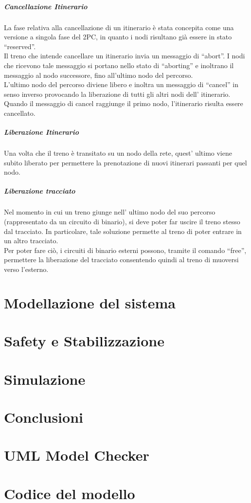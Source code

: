 \documentclass[10pt,a4paper,oneside]{report}
\begin{document}
\paragraph*{Cancellazione Itinerario}
La fase relativa alla cancellazione di un itinerario è stata concepita come una versione a singola fase del 2PC, in quanto i nodi risultano già essere in stato ``reserved''.\\
Il treno che intende cancellare un itinerario invia un messaggio di ``abort''. I nodi che ricevono tale messaggio si portano nello stato di ``aborting'' e inoltrano il messaggio al nodo successore, fino all'ultimo nodo del percorso.\\
L'ultimo nodo del percorso diviene libero e inoltra un messaggio di ``cancel'' in senso inverso provocando la liberazione di tutti gli altri nodi dell' itinerario. Quando il messaggio di cancel raggiunge il primo nodo, l'itinerario risulta essere cancellato.

\paragraph*{Liberazione Itinerario}
Una volta che il treno è transitato su un nodo della rete, quest' ultimo viene subito liberato per permettere la prenotazione di nuovi itinerari passanti per quel nodo.\\
\paragraph*{Liberazione tracciato}
Nel momento in cui un treno giunge nell' ultimo nodo del suo percorso (rappresentato da un circuito di binario), si deve poter far uscire il treno stesso dal tracciato.
In particolare, tale soluzione permette al treno di poter entrare in un altro tracciato.\\
Per poter fare ciò, i circuiti di binario esterni possono, tramite il comando ``free'', permettere la liberazione del tracciato consentendo quindi al treno di muoversi verso l'esterno.



\chapter{Modellazione del sistema}

\chapter{Safety e Stabilizzazione}

\chapter{Simulazione}

\chapter{Conclusioni}
\appendix
\chapter{UML Model Checker}
\chapter{Codice del modello}
\end{document}
